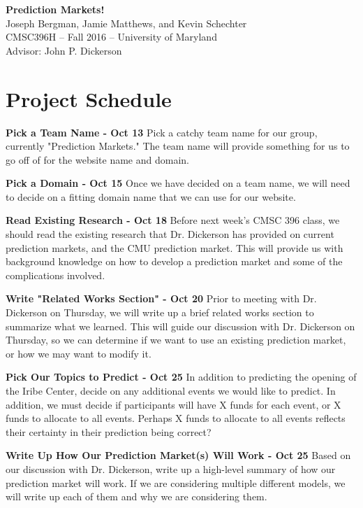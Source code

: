 \documentclass[12pt]{article}
\begin{document}
\begin{center}
{\Large \textbf{Prediction Markets!}}\\
Joseph Bergman, Jamie Matthews, and Kevin Schechter\\
CMSC396H -- Fall 2016 -- University of Maryland\\
Advisor: John P. Dickerson
\end{center}

\section*{Project Schedule}

\textbf{Pick a Team Name - Oct 13}
Pick a catchy team name for our group, currently "Prediction Markets." The team name will provide something for us to go off of for the website name and domain. 

\textbf{Pick a Domain - Oct 15}
Once we have decided on a team name, we will need to decide on a fitting domain name that we can use for our website.

\textbf{Read Existing Research - Oct 18}
Before next week's CMSC 396 class, we should read the existing research that Dr. Dickerson has provided on current prediction markets, and the CMU prediction market. This will provide us with background knowledge on how to develop a prediction market and some of the complications involved.

\textbf{Write "Related Works Section" - Oct 20}
Prior to meeting with Dr. Dickerson on Thursday, we will write up a brief related works section to summarize what we learned. This will guide our discussion with Dr. Dickerson on Thursday, so we can determine if we want to use an existing prediction market, or how we may want to modify it. 

\textbf{Pick Our Topics to Predict - Oct 25}
In addition to predicting the opening of the Iribe Center, decide on any additional events we would like to predict. In addition, we must decide if participants will have X funds for each event, or X funds to allocate to all events. Perhaps X funds to allocate to all events reflects their certainty in their prediction being correct?  

\textbf{Write Up How Our Prediction Market(s) Will Work - Oct 25}
Based on our discussion with Dr. Dickerson, write up a high-level summary of how our prediction market will work. If we are considering multiple different models, we will write up each of them and why we are considering them.  
\end{document}
